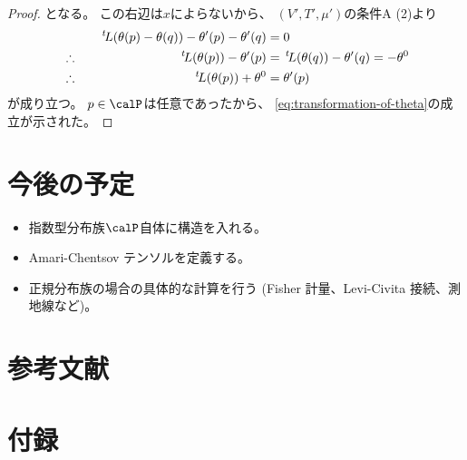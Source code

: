\documentclass[report]{jlreq}
\begin{document}
\begin{proof}
    となる。
    この右辺は$x$によらないから、
    $(V', T', \mu')$の条件A (2)より
    \begin{alignat}{2}
        &\phantom{\therefore} \quad&
            \,{}^{t}\!L(\theta(p) - \theta(q))
                - \theta'(p) - \theta'(q)
                &= 0
            \\
        &\therefore \quad&
            \,{}^{t}\!L(\theta(p)) - \theta'(p)
                &=
                    \,{}^{t}\!L(\theta(q)) - \theta'(q)
                =
                    - \theta^0
            \\
        &\therefore \quad&
            \,{}^{t}\!L(\theta(p)) + \theta^0
                &=
                    \theta'(p)
    \end{alignat}
    が成り立つ。
    $p \in \calP$は任意であったから、
    \cref{eq:transformation-of-theta}の成立が示された。
\end{proof}


%
\section*{今後の予定}

\begin{itemize}
    \item 指数型分布族$\calP$自体に構造を入れる。
    \item Amari-Chentsov テンソルを定義する。
    \item 正規分布族の場合の具体的な計算を行う
        (Fisher 計量、Levi-Civita 接続、測地線など)。
\end{itemize}

%
\section*{参考文献}

\nocite{amari_information_2016}
\nocite{bn1970_pdf}
\nocite{BN78}

{
    \renewcommand{\bibsection}{}
    
    
}

%
\newpage
\appendix
\section*{付録}
\end{document}
